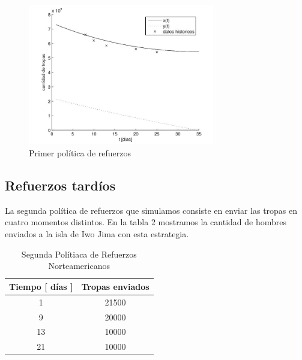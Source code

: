 \documentclass[10pt,journal,compsoc]{IEEEtran}
\begin{document}
\begin{figure}[t]
\label{fig:sim1}
\centering
\includegraphics[width=3.2in]{ref1}
\caption{Primer pol\'itica de refuerzos}
\end{figure}
   
\subsection{Refuerzos tard\'ios}
La segunda pol\'itica de refuerzos que simulamos consiste en enviar las tropas en cuatro momentos distintos. 
 En la tabla 2 mostramos la cantidad de hombres enviados a la isla de Iwo Jima con esta estrategia.  

\begin{table}[!t]
\renewcommand{\arraystretch}{1.3}
\caption{Segunda Pol\'itiaca de Refuerzos Norteamericanos}
\centering
\begin{tabular}{c c}
\hline
\hline
Tiempo [ d\'ias ] & Tropas enviados\\
\hline
1 &  21500\\
9 &  20000 \\
13 & 10000 \\
21 & 10000  \\
\hline
\hline
\end{tabular}
\label{tab:refuerzos2}
\end{table}
\end{document}
